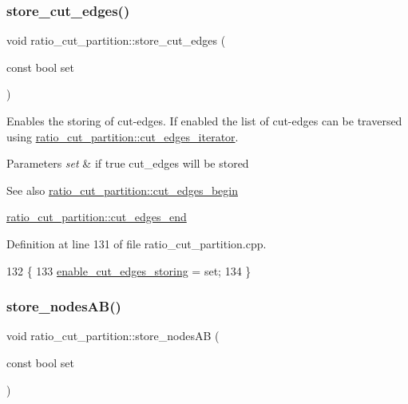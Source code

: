 \subsubsection{\texorpdfstring{store\+\_\+cut\+\_\+edges()}{store\_cut\_edges()}}
{\footnotesize\ttfamily void ratio\+\_\+cut\+\_\+partition\+::store\+\_\+cut\+\_\+edges (\begin{DoxyParamCaption}\item[{const bool}]{set }\end{DoxyParamCaption})}

Enables the storing of cut-\/edges. If enabled the list of cut-\/edges can be traversed using \mbox{\hyperlink{classratio__cut__partition_a910bb0e5c927ffd26a3805787e179194}{ratio\+\_\+cut\+\_\+partition\+::cut\+\_\+edges\+\_\+iterator}}.


\begin{DoxyParams}{Parameters}
{\em set} & if {\ttfamily true} cut\+\_\+edges will be stored \\
\hline
\end{DoxyParams}
\begin{DoxySeeAlso}{See also}
\mbox{\hyperlink{classratio__cut__partition_a657a1d77b3b39037a52e6688674ad760}{ratio\+\_\+cut\+\_\+partition\+::cut\+\_\+edges\+\_\+begin}} 

\mbox{\hyperlink{classratio__cut__partition_a8609d76a4d74cb3b2596ac370c839fce}{ratio\+\_\+cut\+\_\+partition\+::cut\+\_\+edges\+\_\+end}} 
\end{DoxySeeAlso}


Definition at line 131 of file ratio\+\_\+cut\+\_\+partition.\+cpp.


\begin{DoxyCode}
132 \{
133     \mbox{\hyperlink{classratio__cut__partition_a7f2ddebc25563a35cb6424f7a5d4b549}{enable\_cut\_edges\_storing}} = \textcolor{keyword}{set};
134 \}
\end{DoxyCode}
\mbox{\label{classratio__cut__partition_af0efdeab02cb235df47e2339c196051f}} 
\subsubsection{\texorpdfstring{store\+\_\+nodes\+A\+B()}{store\_nodesAB()}}
{\footnotesize\ttfamily void ratio\+\_\+cut\+\_\+partition\+::store\+\_\+nodes\+AB (\begin{DoxyParamCaption}\item[{const bool}]{set }\end{DoxyParamCaption})}

